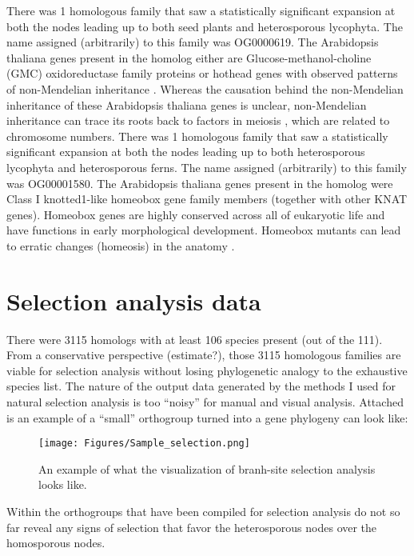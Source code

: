 There was 1 homologous family that saw a statistically significant expansion at both the nodes leading up to both seed plants and heterosporous lycophyta. The name assigned (arbitrarily) to this family was OG0000619. The Arabidopsis thaliana genes present in the homolog either are Glucose-methanol-choline (GMC) oxidoreductase family proteins or hothead genes with observed patterns of non-Mendelian inheritance \cite{Rhee2003-ww}. Whereas the causation behind the non-Mendelian inheritance of these Arabidopsis thaliana genes is unclear, non-Mendelian inheritance can trace its roots back to factors in meiosis \cite{Akera2017-nq}, which are related to chromosome numbers.
There was 1 homologous family that saw a statistically significant expansion at both the nodes leading up to both heterosporous lycophyta and heterosporous ferns. The name assigned (arbitrarily) to this family was OG00001580. The Arabidopsis thaliana genes present in the homolog  were Class I knotted1-like homeobox gene family members (together with other KNAT genes). Homeobox genes are highly conserved across all of eukaryotic life and have functions in early morphological development. Homeobox mutants can lead to erratic changes (homeosis) in the anatomy \cite{Nam2003-ey}.

\section{Selection analysis data}

There were 3115 homologs with at least 106 species present (out of the 111). From a conservative perspective (estimate?), those 3115 homologous families are viable for selection analysis without losing phylogenetic analogy to the exhaustive species list.
The nature of the output data generated by the methods I used for natural selection analysis is too “noisy” for manual and visual analysis. Attached is an example of a “small” orthogroup turned into a gene phylogeny can look like:

\begin{figure}[ht]
    \centering
    \texttt{[image: Figures/Sample\_selection.png]}
    \caption[An example of what the visualization of branh-site selection analysis looks like.]{An example of what the visualization of branh-site selection analysis looks like.}
    \label{fig 5.2}
\end{figure}

Within the orthogroups that have been compiled for selection analysis do not so far reveal any
signs of selection that favor the heterosporous nodes over the homosporous nodes.